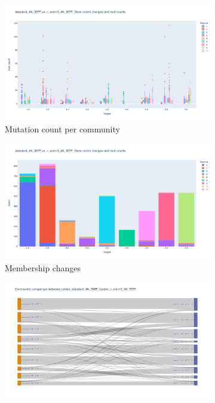 \begin{figure}
\captionsetup[subfigure]{justification=Centering}
\begin{subfigure}[t]{0.5\textwidth}
    \includegraphics[width=\textwidth]{Images/P0/box_standard_4K_50TF_norm3_4K_50TF.png}
    \caption{Mutation count per community}
\end{subfigure}\hspace{\fill} %
\begin{subfigure}[t]{0.5\textwidth}
    \includegraphics[width=\linewidth]{Images/P0/memberShip_standard_4K_50TF_norm3_4K_50TF.png}
    \caption{Membership changes}
\end{subfigure}\hspace{\fill} %
\bigskip %
\begin{subfigure}[t]{0.9\textwidth}
    \includegraphics[width=\linewidth]{Images/P0/sankey_standard_4K_50TF_norm3_4K_50TF.png}

\end{subfigure}
\end{figure}
